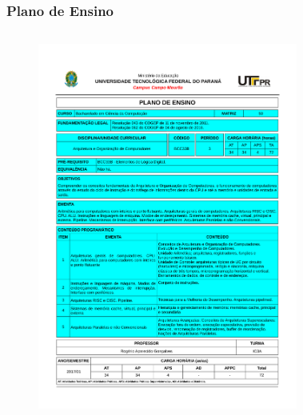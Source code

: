 \documentclass{beamer}
\begin{document}
\begin{frame}[allowframebreaks]
	\frametitle{Plano de Ensino}
	\fontsize{14pt}{7.2}\selectfont
	\begin{minipage}[t][\textheight][t]{\textwidth}
		\vspace{-0.5cm}
		\begin{columns}
			\begin{figure}
				\centering
				\includegraphics[page=3,trim=2.0cm 3.0cm 2.0cm 3.0cm, scale=0.3]{figures/plano-ensino-BCC33B-IC3A}
			\end{figure}
			\begin{figure}
				\centering

\end{figure}
\end{columns}
\end{minipage}
\end{frame}
\end{document}
